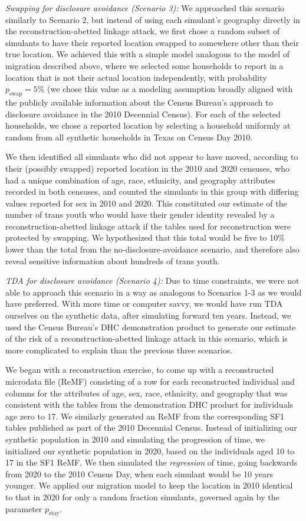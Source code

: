\documentclass{jpc} %
\theoremstyle{plain}\newtheorem{satz}[thm]{Satz} %
\begin{document}
\emph{Swapping for disclosure avoidance (Scenario 3):} We approached this scenario similarly to Scenario 2, but instead of using each simulant's geography directly in the reconstruction-abetted linkage attack, we first chose a random subset of simulants to have their reported location swapped to somewhere other than their true location.  
We achieved this with a simple model analogous to the model of migration described above, where we selected some households to report in a location that is not their actual location independently, with probability $p_\text{swap} = 5\%$ (we chose this value as a modeling assumption broadly aligned with the  publicly available information about the Census Bureau's approach to disclosure avoidance in the 2010 Decennial Census).  For each of the selected households, we chose a reported location by selecting a household uniformly at random from all synthetic households in Texas on Census Day 2010.

We then identified all simulants who did not appear to have moved, according to their (possibly swapped) reported location in the 2010 and 2020 censuses, who had a unique combination of age, race, ethnicity, and geography attributes recorded in both censuses, and counted the simulants in this group with differing values reported for sex in 2010 and 2020.  This constituted our estimate of the number of trans youth who would have their gender identity revealed by a reconstruction-abetted linkage attack if the tables used for reconstruction were protected by swapping.  We hypothesized that this total would be five to 10\% lower than the total from the no-disclosure-avoidance scenario, and therefore also reveal sensitive information about hundreds of trans youth.

\emph{TDA for disclosure avoidance (Scenario 4):} Due to time constraints, we were not able to approach this scenario in a way as analogous to Scenarios 1-3 as we would have preferred.  With more time or computer savvy, we would have run TDA ourselves on the synthetic data, after simulating forward ten years.  Instead, we used the Census Bureau's DHC demonstration product to generate our estimate of the risk of a reconstruction-abetted linkage attack in this scenario, which is more complicated to explain than the previous three scenarios.

We began with a reconstruction exercise, to come up with a reconstructed microdata file (ReMF) consisting of a row for each reconstructed individual and columns for the attributes of age, sex, race, ethnicity, and geography that was consistent with the tables from the demonstration DHC product for individuals age zero to 17.  We similarly generated an ReMF from the corresponding SF1 tables published as part of the 2010 Decennial Census.  Instead of initializing our synthetic population in 2010 and simulating the progression of time, we initialized our synthetic population in 2020, based on the individuals aged 10 to 17 in the SF1 ReMF.  We then simulated the \emph{regression} of time, going backwards from 2020 to the 2010 Census Day, when each simulant would be 10 years younger.  We applied our migration model to keep the location in 2010 identical to that in 2020 for only a random fraction simulants, governed again by the parameter $p_{\text{stay}}$.
\end{document}
